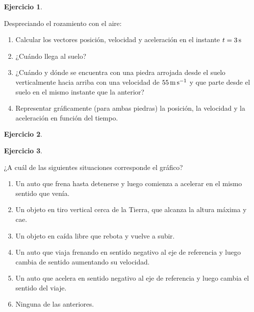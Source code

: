 \documentclass[a4paper,12pt,twoside]{book}
\newtheorem{ejercicio}{{Ejercicio}}[chapter]
\begin{document}
\begin{mdframed}[style=ejercicio-intermedio]
    \begin{ejercicio}
    \end{ejercicio}
    Despreciando el rozamiento con el aire:
    \begin{enumerate}
        \item Calcular los vectores posición, velocidad y aceleración en el instante $t = 3 \, \si{\second}$
        \item ¿Cuándo llega al suelo?
        \item ¿Cuándo y dónde se encuentra con una piedra arrojada desde el suelo verticalmente hacia arriba con una velocidad de $55 \, \si{\metre\per\second}$ y que parte desde el suelo en el mismo instante que la anterior?
        \item Representar gráficamente (para ambas piedras) la posición, la velocidad y la aceleración en función del tiempo.
    \end{enumerate}
\end{mdframed}

\begin{mdframed}[style=ejercicio-intermedio]
    \begin{ejercicio}
    \end{ejercicio}
\end{mdframed}

\begin{mdframed}[style=ejercicio-conceptual]
    \begin{ejercicio}
    \end{ejercicio}
    \begin{center}
        \def\svgwidth{0.4\linewidth}
        
    \end{center}
    ¿A cuál de las siguientes situaciones corresponde el gráfico?
    \begin{enumerate}
        \item Un auto que frena hasta detenerse y luego comienza a acelerar en el mismo sentido que venía.
        \item Un objeto en tiro vertical cerca de la Tierra, que alcanza la altura máxima y cae.
        \item Un objeto en caída libre que rebota y vuelve a subir.
        \item Un auto que viaja frenando en sentido negativo al eje de referencia y luego cambia de sentido aumentando su velocidad.
        \item Un auto que acelera en sentido negativo al eje de referencia y luego cambia el sentido del viaje.
        \item Ninguna de las anteriores.
    \end{enumerate}
\end{mdframed}
\end{document}
